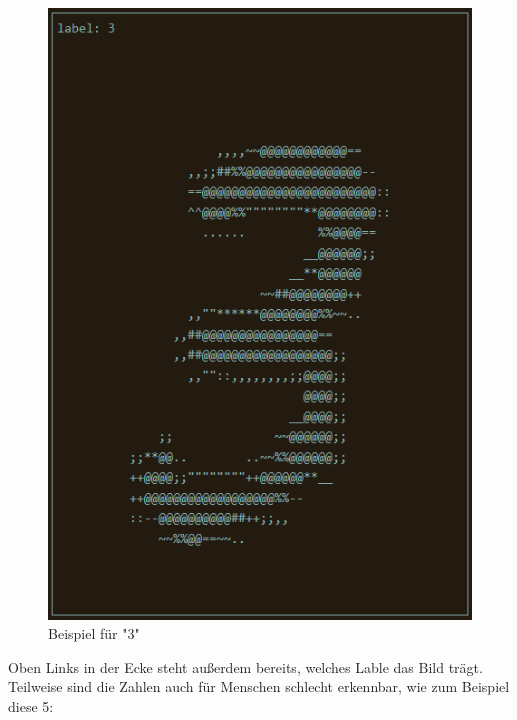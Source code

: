 \documentclass[12pt]{article}
\begin{document}
\begin{figure}[H]
\centering
\includegraphics[scale=0.60]{./Images/Pasted image 20231001133125.png}
\caption{Beispiel für "3"}
\label{Beispiel für "3"}
\end{figure}
Oben Links in der Ecke steht außerdem bereits, welches Lable das Bild trägt. Teilweise sind die Zahlen auch für Menschen schlecht erkennbar, wie zum Beispiel diese 5:
\end{document}
